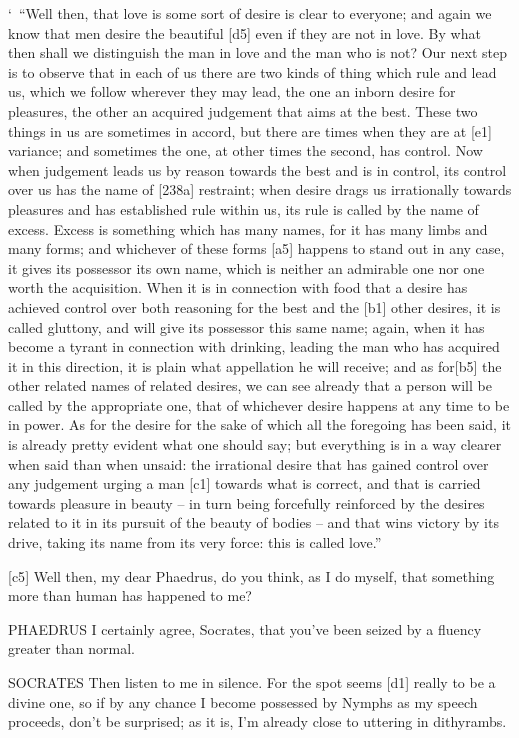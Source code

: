 ‘~“Well then, that love is some sort of
desire is clear to
everyone; and again we know that men desire the
beautiful {[}d5{]} even
if they are not in love. By what then shall we distinguish the man in
love and the man who is not? Our next step is to observe that in each of
us there are two kinds of thing which rule and lead us, which we follow
wherever they may lead, the one an inborn desire for pleasures, the
other an acquired judgement that aims at the best. These two things in
us are sometimes in accord, but there are times when they are at
{[}e1{]} variance; and sometimes the one, at other times the second, has
control. Now when judgement leads us by reason towards the best and is
in control, its control over us has the name of {[}238a{]}
restraint; when desire
drags us irrationally towards pleasures and has established rule within
us, its rule is called by the name of
excess. Excess is
something which has many names, for it has many limbs and many forms;
and whichever of these forms {[}a5{]} happens to stand out in any case,
it gives its possessor its own name, which is neither an admirable one
nor one worth the acquisition. When it is in connection with food that a
desire has achieved control over both reasoning for the best and the
{[}b1{]} other desires, it is called gluttony, and will give its
possessor this same name; again, when it has become a tyrant in
connection with drinking, leading the man who has acquired it in this
direction, it is plain what appellation he will receive; and as
for{[}b5{]} the other related names of related desires, we can see
already that a person will be called by the appropriate one, that of
whichever desire happens at any time to be in power. As for the desire
for the sake of which all the foregoing has been said, it is already
pretty evident what one should say; but everything is in a way clearer
when said than when unsaid: the irrational desire that has gained
control over any judgement urging a man {[}c1{]} towards what is
correct, and that is carried towards pleasure in beauty -- in turn being
forcefully reinforced by the desires related to it in its pursuit of the
beauty of bodies -- and that wins victory by its drive, taking its name
from its very force: this is called
love.”

{[}c5{]} Well then, my dear Phaedrus, do you think, as I do myself, that
something more than
human has happened to
me?

PHAEDRUS I certainly agree, Socrates, that you've been seized by a
fluency greater than normal.

SOCRATES Then listen to me in silence. For the spot seems {[}d1{]}
really to be a divine one, so if by any chance I become possessed by
Nymphs as my speech proceeds, don't be surprised; as it is, I'm already
close to uttering in
dithyrambs.


